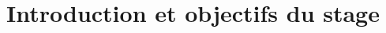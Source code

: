 \documentclass{themeensg}
\begin{document}

\newevenpage
\chapter*{Introduction et objectifs du stage}
  
\end{document}
